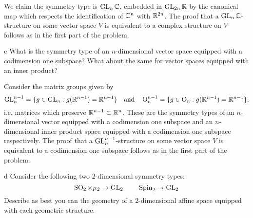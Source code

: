 \documentclass{../../templates/lkx_pset}
\begin{document}
\begin{parts}
	We claim the symmetry type is $\operatorname{GL}_n\mathbb{C}$, embedded in $\operatorname{GL}_{2n}\mathbb{R}$ by the canonical map which respects the identification of $\mathbb{C}^n$ with $\mathbb{R}^{2n}$. 
	The proof that a $\operatorname{GL}_n\mathbb{C}$-structure on some vector space $V$ is equivalent to a complex structure on $V$ follows as in the first part of the problem.

	\begin{part}{c}
		What is the symmetry type of an $n$-dimensional vector space equipped with a codimension one subspace? What about the same for vector spaces equipped with an inner product?
	\end{part}

	Consider the matrix groups given by
	\[
		\operatorname{GL}_{n}^{n-1} = \{ g \in \operatorname{GL}_n : g(\mathbb{R}^{n-1}) = \mathbb{R}^{n-1}\}\quad\textrm{and}\quad
		\operatorname{O}_{n}^{n-1} = \{ g \in \operatorname{O}_n : g(\mathbb{R}^{n-1}) = \mathbb{R}^{n-1}\},
	\]
	i.e. matrices which preserve $\mathbb{R}^{n-1}\subset \mathbb{R}^n$. These are the symmetry types of an $n$-dimensional vector equipped with a codimension one subspace and an $n$-dimensional inner product space equipped with a codimension one subspace respectively.
	The proof that a $\operatorname{GL}_n^{n-1}$-structure on some vector space $V$ is equivalent to a codimension one subspace follows as in the first part of the problem.

	\begin{part}{d}
		Consider the following two $2$-dimensional symmetry types:
		\[
			\operatorname{SO}_2\times \mu_2 \to \operatorname{GL}_2 \quad\textrm{}\quad \operatorname{Spin}_2 \to \operatorname{GL}_2
		\]
		Describe as best you can the geometry of a $2$-dimensional affine space equipped with each geometric structure.
	\end{part}


\end{parts}
\end{document}
